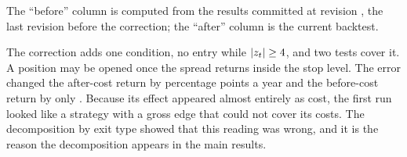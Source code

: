\documentclass[11pt]{article}
\begin{document}
\begin{table}[h]
\centering
\caption{The backtest before and after the correction}
\label{tab:fix}
\small

\begin{tablenote}
The ``before'' column is computed from the results committed at revision
, the last revision before the correction; the ``after'' column is the
current backtest.
\end{tablenote}
\end{table}

The correction adds one condition, no entry while $|z_t| \ge 4$, and two tests
cover it. A position may be opened once the spread returns inside the stop level.
The error changed the after-cost return by \FixNetChange{} percentage points a year
and the before-cost return by only \FixGrossChange{}. Because its effect appeared
almost entirely as cost, the first run looked like a strategy with a gross edge that
could not cover its costs. The decomposition by exit type showed that this reading
was wrong, and it is the reason the decomposition appears in the main results.
\end{document}
